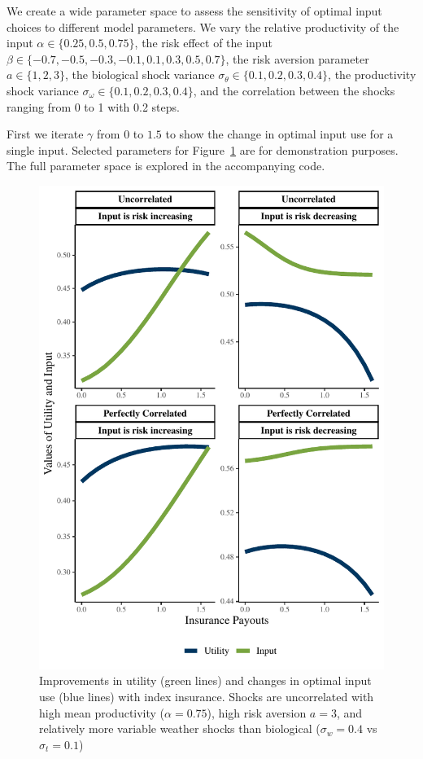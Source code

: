 \documentclass[
  letterpaper,
  DIV=11,
  numbers=noendperiod]{scrartcl}
\theoremstyle{plain}
\theoremstyle{plain}
\theoremstyle{remark}
\begin{document}
We create a wide parameter space to assess the sensitivity of optimal
input choices to different model parameters. We vary the relative
productivity of the input \(\alpha\in\{0.25,0.5,0.75\}\), the risk
effect of the input \(\beta\in\{-0.7,-0.5,-0.3,-0.1,0.1,0.3,0.5,0.7\}\),
the risk aversion parameter \(a\in\{1,2,3\}\), the biological shock
variance \(\sigma_{\theta}\in\{0.1,0.2,0.3,0.4\}\), the productivity
shock variance \(\sigma_{\omega}\in\{0.1,0.2,0.3,0.4\}\), and the
correlation between the shocks ranging from 0 to 1 with 0.2 steps.

First we iterate \(\gamma\) from \(0\) to \(1.5\) to show the change in
optimal input use for a single input. Selected parameters for
Figure~\ref{fig-iter} are for demonstration purposes. The full parameter
space is explored in the accompanying code.

\begin{figure}

{\centering \includegraphics{ibi-behavior_files/figure-pdf/fig-iter-1.pdf}

}

\caption{\label{fig-iter}Improvements in utility (green lines) and
changes in optimal input use (blue lines) with index insurance. Shocks
are uncorrelated with high mean productivity (\(\alpha=0.75\)), high
risk aversion \(a=3\), and relatively more variable weather shocks than
biological (\(\sigma_{w}=0.4\) vs \(\sigma_{t}=0.1\))}

\end{figure}
\end{document}

